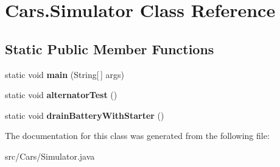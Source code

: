 \hypertarget{classCars_1_1Simulator}{}\section{Cars.\+Simulator Class Reference}
\label{classCars_1_1Simulator}
\subsection*{Static Public Member Functions}
\begin{DoxyCompactItemize}
\item 
\hypertarget{classCars_1_1Simulator_a6c6d389cb0280939fd53911c301188b6}{}static void {\bfseries main} (String\mbox{[}$\,$\mbox{]} args)\label{classCars_1_1Simulator_a6c6d389cb0280939fd53911c301188b6}

\item 
\hypertarget{classCars_1_1Simulator_a8fbd5040759a6fdb37d78c66a23855bd}{}static void {\bfseries alternator\+Test} ()\label{classCars_1_1Simulator_a8fbd5040759a6fdb37d78c66a23855bd}

\item 
\hypertarget{classCars_1_1Simulator_af250a3c4192de9390ff0c7ae39e99f6c}{}static void {\bfseries drain\+Battery\+With\+Starter} ()\label{classCars_1_1Simulator_af250a3c4192de9390ff0c7ae39e99f6c}

\end{DoxyCompactItemize}


The documentation for this class was generated from the following file\+:\begin{DoxyCompactItemize}
\item 
src/\+Cars/Simulator.\+java\end{DoxyCompactItemize}
